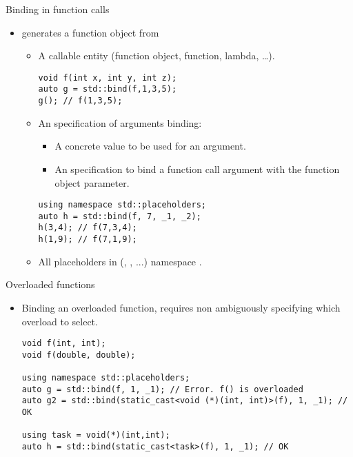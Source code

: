 \begin{frame}[t,fragile]{Binding in function calls}
  \begin{itemize}
    \item {} generates a function object from
      \begin{itemize}
        \item A callable entity (function object, function, lambda, \ldots).

\begin{lstlisting}
void f(int x, int y, int z);
auto g = std::bind(f,1,3,5);
g(); // f(1,3,5);
\end{lstlisting}

        \pause
        \item An specification of arguments binding:
          \begin{itemize}
            \item A concrete value to be used for an argument.
            \item An specification to bind a function call argument with
                  the function object parameter.
          \end{itemize}
\begin{lstlisting}
using namespace std::placeholders;
auto h = std::bind(f, 7, _1, _2);
h(3,4); // f(7,3,4);
h(1,9); // f(7,1,9);
\end{lstlisting}

        \pause
        \item All placeholders in (, , ...) namespace
              .
      \end{itemize}
  \end{itemize}
\end{frame}

\begin{frame}[t,fragile]{Overloaded functions}
\begin{itemize}
  \item Binding an overloaded function, requires
        non ambiguously specifying which overload to select.
\begin{lstlisting}
void f(int, int);
void f(double, double);

using namespace std::placeholders;
auto g = std::bind(f, 1, _1); // Error. f() is overloaded
auto g2 = std::bind(static_cast<void (*)(int, int)>(f), 1, _1); // OK

using task = void(*)(int,int);
auto h = std::bind(static_cast<task>(f), 1, _1); // OK
\end{lstlisting}
\end{itemize}
\end{frame}

